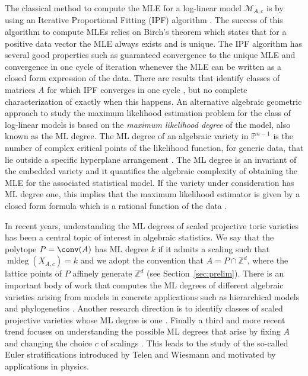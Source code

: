 \documentclass[12pt,reqno]{amsart}   	%
\theoremstyle{plain}
\theoremstyle{definition}
\theoremstyle{remark}
\newcommand{\MM}{\mathcal{M}}
\newcommand{\Z}{\mathbb{Z}}
\newcommand{\pp}{\mathbb{P}}
\newcommand{\mldeg}{\operatorname{mldeg}}
\begin{document}
The classical method to compute the MLE for a log-linear model $\MM_{A,c}$ is by using an Iterative Proportional Fitting (IPF) algorithm \cite{bishop2007}. The success of this algorithm to compute MLEs  relies on Birch's theorem \cite[Corollary 7.3.9] {sullivant2019} which states that for a positive data vector the MLE always exists and is unique.  The IPF algorithm has
several good properties such as guaranteed convergence to the unique MLE and convergence in one cycle of iteration whenever the MLE can
be written as a closed form expression of the data. 
There are results that identify classes of matrices $A$
for which IPF converges in one cycle \cite{coons24},  but no complete characterization of exactly when this happens.
An alternative algebraic geometric approach
to study the maximum likelihood estimation problem for the class of log-linear models is based on the \emph{maximum likelihood degree} of the model, also known as the ML degree.
The ML degree of an algebraic variety in $\pp^{n-1}$ is the number of complex critical points of the likelihood function, for generic data, that lie outside a specific hyperplane arrangement \cite{huhsturmfels2014}. The ML degree is an invariant of the embedded variety and it quantifies the algebraic complexity of obtaining the MLE
for the associated statistical model. If the variety under consideration has ML degree one, this implies that the maximum likelihood estimator is given by a closed form formula which is a rational function of the data \cite{huh2014,duarte2021}. 

In recent years, understanding the ML degrees of scaled projective toric varieties has been a central topic of interest in algebraic statistics. We say that the polytope $P=\conv(A)$ has ML degree $k$ if it admits a scaling such that $\mldeg(X_{A,c})=k$ and we adopt the convention that $A=P\cap \Z^d$, where the lattice points of $P$
affinely generate $\Z^d$ (see Section~\ref{sec:prelim}).
There is an important body of work that computes the ML degrees of different algebraic varieties arising from models in concrete 
applications such as hierarchical models and phylogenetics \cite{amendola2019,brysiewicz2023,garcia2023}.
Another research direction is to identify classes of scaled projective varieties whose ML degree is one \cite{coons2021,coons2024,davies2023,clarke2020,geiger2006}.
Finally a third and more recent trend focuses on understanding the possible ML degrees that arise by fixing $A$ and changing the choice $c$ of scalings \cite{clarke2024,AKK20,amendola2024}.
This leads to the study of the so-called Euler stratifications introduced by Telen and Wiesmann \cite{telen2024} and motivated by applications in physics.
\end{document}
